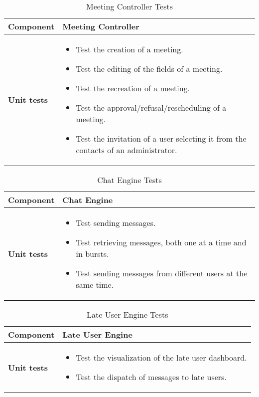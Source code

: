 \begin{table}[H]	
	\centering
	\def\arraystretch{1.5}
	\begin{tabular}{|m{4cm}|m{12cm}|}
		\hline
		\textbf{Component} & Meeting Controller \\ \hline
		\textbf{Unit tests} & 
			\begin{itemize}
			\item Test the creation of a meeting.
			\item Test the editing of the fields of a meeting.
			\item Test the recreation of a meeting.
			\item Test the approval/refusal/rescheduling of a meeting.
			\item Test the invitation of a user selecting it from the contacts of an administrator.
			\end{itemize} \\ \hline
	\end{tabular}
	\caption{Meeting Controller Tests}
\end{table}

\begin{table}[H]	
	\centering
	\def\arraystretch{1.5}
	\begin{tabular}{|m{4cm}|m{12cm}|}
		\hline
		\textbf{Component} & Chat Engine \\ \hline
		\textbf{Unit tests} & 
			\begin{itemize}
			\item Test sending messages.
			\item Test retrieving messages, both one at a time and in bursts.
			\item Test sending messages from different users at the same time.
			\end{itemize} \\ \hline
	\end{tabular}
	\caption{Chat Engine Tests}
\end{table}

\begin{table}[H]	
	\centering
	\def\arraystretch{1.5}
	\begin{tabular}{|m{4cm}|m{12cm}|}
		\hline
		\textbf{Component} & Late User Engine \\ \hline
		\textbf{Unit tests} & 
			\begin{itemize}
			\item Test the visualization of the late user dashboard.
			\item Test the dispatch of messages to late users.
			\end{itemize} \\ \hline
	\end{tabular}
	\caption{Late User Engine Tests}
\end{table}

